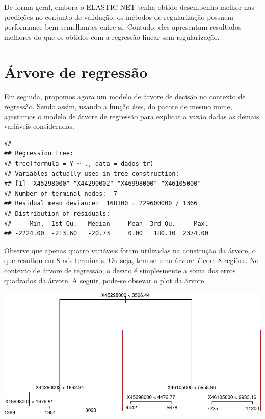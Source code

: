 \documentclass[11pt,]{article}
\begin{document}
De forma geral, embora o ELASTIC NET tenha obtido desempenho melhor nas
predições no conjunto de validação, os métodos de regularização possuem
performance bem semelhantes entre si. Contudo, eles apresentam
resultados melhores do que os obtidos com a regressão linear sem
regularização.

\hypertarget{uxe1rvore-de-regressuxe3o}{%
\section{Árvore de regressão}\label{uxe1rvore-de-regressuxe3o}}

Em seguida, propomos agora um modelo de árvore de decisão no contexto de
regressão. Sendo assim, usando a função \textit{tree}, do pacote de
mesmo nome, ajustamos o modelo de árvore de regressão para explicar a
vazão dadas as demais variáveis consideradas.

\begin{verbatim}
## 
## Regression tree:
## tree(formula = Y ~ ., data = dados_tr)
## Variables actually used in tree construction:
## [1] "X45298000" "X44290002" "X46998000" "X46105000"
## Number of terminal nodes:  7 
## Residual mean deviance:  168100 = 229600000 / 1366 
## Distribution of residuals:
##     Min.  1st Qu.   Median     Mean  3rd Qu.     Max. 
## -2224.00  -213.60   -20.73     0.00   180.10  2374.00
\end{verbatim}

Observe que apenas quatro variáveis foram utilizadas na construção da
árvore, o que resultou em \(8\) nós terminais. Ou seja, tem-se uma
árvore \(T\) com \(8\) regiões. No contexto de árvore de regressão, o
desvio é simplesmente a soma dos erros quadrados da árvore. A seguir,
pode-se obsevar o plot da árvore.

\includegraphics{figs/unnamed-chunk-13.pdf}
\end{document}
